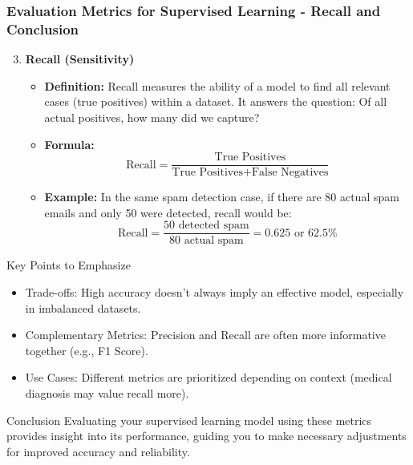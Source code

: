 \documentclass{beamer}
\begin{document}
\begin{frame}[fragile]
    \frametitle{Evaluation Metrics for Supervised Learning - Recall and Conclusion}
    \begin{enumerate}
        \setcounter{enumi}{2}
        \item \textbf{Recall (Sensitivity)}
        \begin{itemize}
            \item \textbf{Definition:} Recall measures the ability of a model to find all relevant cases (true positives) within a dataset. It answers the question: Of all actual positives, how many did we capture?
            \item \textbf{Formula:}
            \begin{equation}
            \text{Recall} = \frac{\text{True Positives}}{\text{True Positives} + \text{False Negatives}}
            \end{equation}
            \item \textbf{Example:} In the same spam detection case, if there are 80 actual spam emails and only 50 were detected, recall would be:
            \begin{equation}
            \text{Recall} = \frac{50 \text{ detected spam}}{80 \text{ actual spam}} = 0.625 \text{ or } 62.5\%
            \end{equation}
        \end{itemize}
    \end{enumerate}
    
    \begin{block}{Key Points to Emphasize}
        \begin{itemize}
            \item Trade-offs: High accuracy doesn’t always imply an effective model, especially in imbalanced datasets.
            \item Complementary Metrics: Precision and Recall are often more informative together (e.g., F1 Score).
            \item Use Cases: Different metrics are prioritized depending on context (medical diagnosis may value recall more).
        \end{itemize}
    \end{block}
    
    \begin{block}{Conclusion}
        Evaluating your supervised learning model using these metrics provides insight into its performance, guiding you to make necessary adjustments for improved accuracy and reliability.
    \end{block}
\end{frame}
\end{document}
